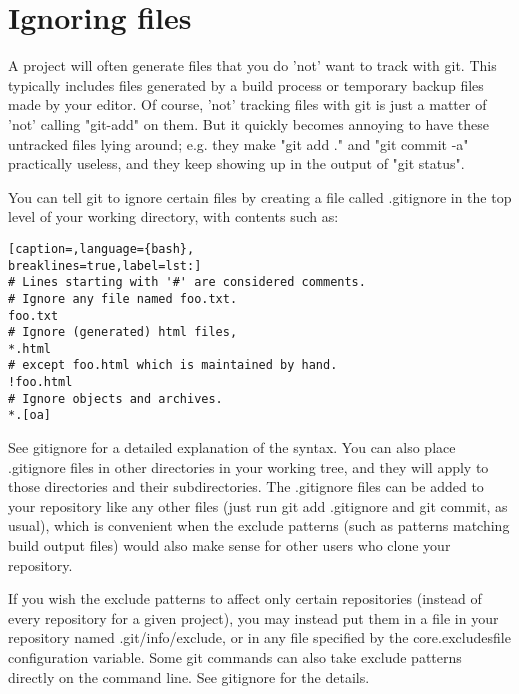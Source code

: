 \section{Ignoring files}
A project will often generate files that you do 'not' want to track with git.
This typically includes files generated by a build process or temporary backup
files made by your editor. Of course, 'not' tracking files with git is just a
matter of 'not' calling "git-add" on them. But it quickly becomes annoying to
have these untracked files lying around; e.g. they make "git add ." and "git
commit -a" practically useless, and they keep showing up in the output of "git
status".

You can tell git to ignore certain files by creating a file called .gitignore
in the top level of your working directory, with contents such as:
\lstset{basicstyle=\scriptsize, numbers=none, captionpos=b, tabsize=4}
\begin{lstlisting}[caption=,language={bash},
breaklines=true,label=lst:]
# Lines starting with '#' are considered comments.
# Ignore any file named foo.txt.
foo.txt
# Ignore (generated) html files,
*.html
# except foo.html which is maintained by hand.
!foo.html
# Ignore objects and archives.
*.[oa]
\end{lstlisting}

See gitignore for a detailed explanation of the syntax. You can also place
.gitignore files in other directories in your working tree, and they will apply
to those directories and their subdirectories. The .gitignore files can be
added to your repository like any other files (just run git add .gitignore and
git commit, as usual), which is convenient when the exclude patterns (such as
patterns matching build output files) would also make sense for other users who
clone your repository.

If you wish the exclude patterns to affect only certain repositories (instead
of every repository for a given project), you may instead put them in a file in
your repository named .git/info/exclude, or in any file specified by the
core.excludesfile configuration variable. Some git commands can also take
exclude patterns directly on the command line. See gitignore for the details.
